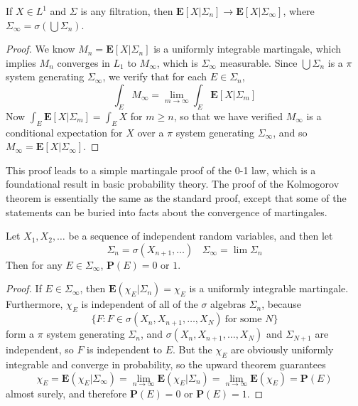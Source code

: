 \begin{theorem}
    If $X \in L^1$ and $\Sigma$ is any filtration, then $\mathbf{E}[X|\Sigma_n] \to \mathbf{E}[X|\Sigma_\infty]$, where $\Sigma_\infty = \sigma(\bigcup \Sigma_n)$.
\end{theorem}
\begin{proof}
    We know $M_n = \mathbf{E}[X|\Sigma_n]$ is a uniformly integrable martingale, which implies $M_n$ converges in $L_1$ to $M_\infty$, which is $\Sigma_\infty$ measurable. Since $\bigcup \Sigma_n$ is a $\pi$ system generating $\Sigma_\infty$, we verify that for each $E \in \Sigma_n$,
    \[ \int_E M_\infty = \lim_{m \to \infty} \int_E \mathbf{E}[X|\Sigma_m] \]
    Now $\int_E \mathbf{E}[X|\Sigma_m] = \int_E X$ for $m \geq n$, so that we have verified $M_\infty$ is a conditional expectation for $X$ over a $\pi$ system generating $\Sigma_\infty$, and so $M_\infty = \mathbf{E}[X|\Sigma_\infty]$.
\end{proof}

This proof leads to a simple martingale proof of the 0-1 law, which is a foundational result in basic probability theory. The proof of the Kolmogorov theorem is essentially the same as the standard proof, except that some of the statements can be buried into facts about the convergence of martingales.

\begin{corollary}
    Let $X_1, X_2, \dots$ be a sequence of independent random variables, and then let
    \[ \Sigma_n = \sigma(X_{n+1}, \dots)\ \ \ \ \Sigma_\infty = \lim \Sigma_n \]
    Then for any $E \in \Sigma_\infty$, $\mathbf{P}(E) = 0$ or $1$.
\end{corollary}
\begin{proof}
    If $E \in \Sigma_\infty$, then $\mathbf{E}(\chi_E | \Sigma_n) = \chi_E$ is a uniformly integrable martingale. Furthermore, $\chi_E$ is independent of all of the $\sigma$ algebras $\Sigma_n$, because
    \[ \{ F: F \in \sigma(X_n, X_{n+1}, \dots, X_N)\ \text{for some $N$} \} \]
    form a $\pi$ system generating $\Sigma_n$, and $\sigma(X_n,X_{n+1}, \dots, X_N)$ and $\Sigma_{N+1}$ are independent, so $F$ is independent to $E$. But the $\chi_E$ are obviously uniformly integrable and converge in probability, so the upward theorem guarantees
    \[ \chi_E = \mathbf{E}(\chi_E|\Sigma_\infty) = \lim_{n \to \infty} \mathbf{E}(\chi_E|\Sigma_n) = \lim_{n \to \infty} \mathbf{E}(\chi_E) = \mathbf{P}(E) \]
    almost surely, and therefore $\mathbf{P}(E) = 0$ or $\mathbf{P}(E) = 1$.
\end{proof}

